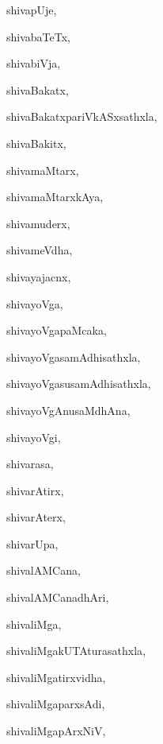 \begin{multicols}{3}
{\noindent
{shivapUje}, \pageref{shivapUje}

\noindent
{shivabaTeTx}, \pageref{shivabaTeTx}

\noindent
{shivabiVja}, \pageref{shivabiVja}

\noindent
{shivaBakatx}, \pageref{shivaBakatx}

\noindent
{shivaBakatxpariVkASxsathxla}, \pageref{shivaBakatxpariVkASxsathxla}

\noindent
{shivaBakitx}, \pageref{shivaBakitx}

\noindent
{shivamaMtarx}, \pageref{shivamaMtarx}

\noindent
{shivamaMtarxkAya}, \pageref{shivamaMtarxkAya}

\noindent
{shivamuderx}, \pageref{shivamuderx}

\noindent
{shivameVdha}, \pageref{shivameVdha}

\noindent
{shivayajacnx}, \pageref{shivayajacnx}

\noindent
{shivayoVga}, \pageref{shivayoVga}

\noindent
{shivayoVgapaMcaka}, \pageref{shivayoVgapaMcaka}

\noindent
{shivayoVgasamAdhisathxla}, \pageref{shivayoVgasamAdhisathxla}

\noindent
{shivayoVgasusamAdhisathxla}, \pageref{shivayoVgasusamAdhisathxla}

\noindent
{shivayoVgAnusaMdhAna}, \pageref{shivayoVgAnusaMdhAna}

\noindent
{shivayoVgi}, \pageref{shivayoVgi}

\noindent
{shivarasa}, \pageref{shivarasa}

\noindent
{shivarAtirx}, \pageref{shivarAtirx}

\noindent
{shivarAterx}, \pageref{shivarAterx}

\noindent
{shivarUpa}, \pageref{shivarUpa}

\noindent
{shivalAMCana}, \pageref{shivalAMCana}

\noindent
{shivalAMCanadhAri}, \pageref{shivalAMCanadhAri}

\noindent
{shivaliMga}, \pageref{shivaliMga}

\noindent
{shivaliMgakUTAturasathxla}, \pageref{shivaliMgakUTAturasathxla}

\noindent
{shivaliMgatirxvidha}, \pageref{shivaliMgatirxvidha}

\noindent
{shivaliMgaparxsAdi}, \pageref{shivaliMgaparxsAdi}

\noindent
{shivaliMgapArxNiV}, \pageref{shivaliMgapArxNiV}

}
\end{multicols}
